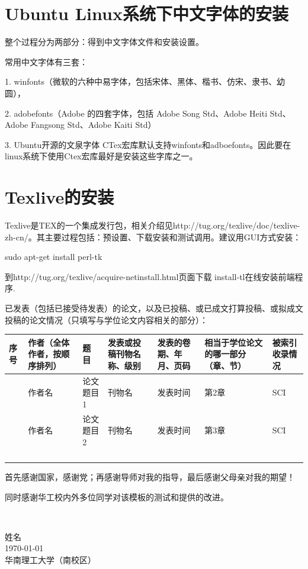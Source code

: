 \documentclass[unicode,pdfcover]{scutthesis}
\begin{document}
\section{Ubuntu Linux系统下中文字体的安装}
\label{sec:ubuntuzhfont}
整个过程分为两部分：得到中文字体文件和安装设置。

常用中文字体有三套：

1. winfonts（微软的六种中易字体，包括宋体、黑体、楷书、仿宋、隶书、幼圆），

2. adobefonts（Adobe 的四套字体，包括 Adobe Song Std、Adobe Heiti Std、Adobe
Fangsong Std、Adobe Kaiti Std）

3. Ubuntu开源的文泉字体
CTex宏库默认支持winfonts和adboefonts。因此要在linux系统下使用Ctex宏库最好是安装这些字库之一。

\section{Texlive的安装}

\label{sec:texlive_install}

Texlive是TEX的一个集成发行包，相关介绍见http://tug.org/texlive/doc/texlive-zh-cn/。其主要过程包括：预设置、下载安装和测试调用。建议用GUI方式安装：

sudo apt-get install perl-tk

到http://tug.org/texlive/acquire-netinstall.html页面下载 install-tl在线安装前端程序.



已发表（包括已接受待发表）的论文，以及已投稿、或已成文打算投稿、或拟成文投稿的论文情况（只填写与学位论文内容相关的部分）：

\begin{longtable}{|>{\centering}m{0.5cm}|>{\centering}m{2.3cm}|>{\centering}m{3.5cm}|>{\centering}m{2.6cm}|>{\centering}m{2cm}|>{\centering}m{1.3cm}|>{\centering}m{0.9cm}|}
\hline
序号 & 作者（全体作者，按顺序排列） & 题 目 & 发表或投稿刊物名称、级别 & 发表的卷期、年月、页码 & 相当于学位论文的哪一部分（章、节） & 被索引收录情况\tabularnewline
\hline
1 & 作者名 & 论文题目1 & 刊物名 & 发表时间 & 第2章 & SCI\tabularnewline
\hline
2 & 作者名 & 论文题目2 & 刊物名 & 发表时间 & 第3章 & SCI\tabularnewline
\hline
 &  &  &  &  &  & \tabularnewline
\hline
 &  &  &  &  &  & \tabularnewline
\hline
 &  &  &  &  &  & \tabularnewline
\hline
 &  &  &  &  &  & \tabularnewline
\hline
\end{longtable}



首先感谢国家，感谢党；再感谢导师对我的指导，最后感谢父母亲对我的期望！

同时感谢华工校内外多位同学对该模板的测试和提供的改进。

~\\

\begin{minipage}[t]{0.945\textwidth}%
\begin{flushright}
姓名\\
\today\\
华南理工大学（南校区）%
\par\end{flushright}
\end{minipage}
\end{document}
